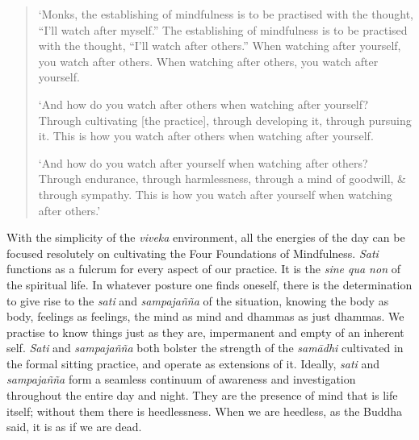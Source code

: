 \begin{quote}
`Monks, the establishing of mindfulness is to be practised with the thought, ``I'll watch after myself.'' The establishing of mindfulness is to be practised with the thought, ``I'll watch after others.'' When watching after yourself, you watch after others. When watching after others, you watch after yourself.

`And how do you watch after others when watching after yourself? Through cultivating [the practice], through developing it, through pursuing it. This is how you watch after others when watching after yourself.

`And how do you watch after yourself when watching after others? Through endurance, through harmlessness, through a mind of goodwill, \& through sympathy. This is how you watch after yourself when watching after others.'

\end{quote}

With the simplicity of the \emph{viveka} environment, all the energies
of the day can be focused resolutely on cultivating the Four Foundations
of Mindfulness. \emph{Sati} functions as a fulcrum for every aspect of
our practice. It is the \emph{sine qua non} of the spiritual life. In
whatever posture one finds oneself, there is the determination to give
rise to the \emph{sati} and \emph{sampajañña} of the situation, knowing
the body as body, feelings as feelings, the mind as mind and dhammas as
just dhammas. We practise to know things just as they are, impermanent
and empty of an inherent self. \emph{Sati} and \emph{sampajañña} both
bolster the strength of the \emph{samādhi} cultivated in the formal
sitting practice, and operate as extensions of it. Ideally, \emph{sati}
and \emph{sampajañña} form a seamless continuum of awareness and
investigation throughout the entire day and night. They are the presence
of mind that is life itself; without them there is heedlessness. When we
are heedless, as the Buddha said, it is as if we are dead. 

